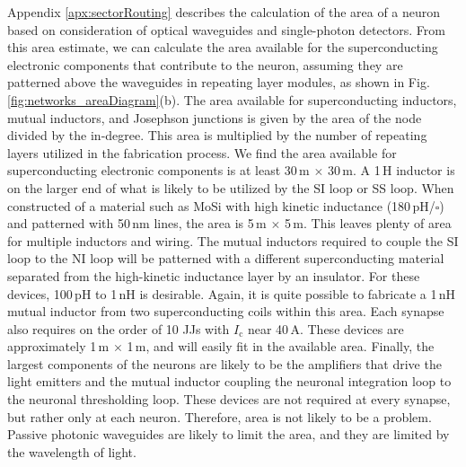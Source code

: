 \documentclass[twocolumn]{article}
\begin{document}
Appendix \ref{apx:sectorRouting} describes the calculation of the area of a neuron based on consideration of optical waveguides and single-photon detectors. From this area estimate, we can calculate the area available for the superconducting electronic components that contribute to the neuron, assuming they are patterned above the waveguides in repeating layer modules, as shown in Fig.\,\ref{fig:networks_areaDiagram}(b). The area available for superconducting inductors, mutual inductors, and Josephson junctions is given by the area of the node divided by the in-degree. This area is multiplied by the number of repeating layers utilized in the fabrication process. We find the area available for superconducting electronic components is at least 30\,\textmu m $\times$ 30\,\textmu m. A 1\,\textmu H inductor is on the larger end of what is likely to be utilized by the SI loop or SS loop. When constructed of a material such as MoSi with high kinetic inductance (180\,pH/$\square$) and patterned with 50\,nm lines, the area is 5\,\textmu m $\times$ 5\,\textmu m. This leaves plenty of area for multiple inductors and wiring. The mutual inductors required to couple the SI loop to the NI loop will be patterned with a different superconducting material separated from the high-kinetic inductance layer by an insulator. For these devices, 100\,pH to 1\,nH is desirable. Again, it is quite possible to fabricate a 1\,nH mutual inductor from two superconducting coils within this area. Each synapse also requires on the order of 10 JJs with $I_{\mathrm{c}}$ near 40\,\textmu A. These devices are approximately 1\,\textmu m $\times$ 1\,\textmu m, and will easily fit in the available area. Finally, the largest components of the neurons are likely to be the amplifiers that drive the light emitters and the mutual inductor coupling the neuronal integration loop to the neuronal thresholding loop. These devices are not required at every synapse, but rather only at each neuron. Therefore, area is not likely to be a problem. Passive photonic waveguides are likely to limit the area, and they are limited by the wavelength of light.
\end{document}
